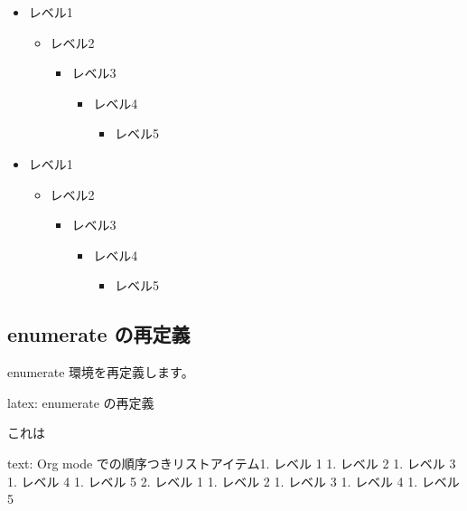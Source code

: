 \documentclass[dvipdfmx,a4j,14pt,uplatex,openany]{jsbook}
\begin{document}
\begin{itemize}
\item レベル1
\begin{itemize}
\item レベル2
\begin{itemize}
\item レベル3
\begin{itemize}
\item レベル4
\begin{itemize}
\item レベル5
\end{itemize}
\end{itemize}
\end{itemize}
\end{itemize}
\item レベル1
\begin{itemize}
\item レベル2
\begin{itemize}
\item レベル3
\begin{itemize}
\item レベル4
\begin{itemize}
\item レベル5
\end{itemize}
\end{itemize}
\end{itemize}
\end{itemize}
\end{itemize}

\subsection{enumerate の再定義}
\label{sec:orgddf24a6}
enumerate 環境を再定義します。

\begin{programlist}[label={org5f332ba}]{latex}{: enumerate の再定義}
\end{programlist}

これは

\begin{programlist}[label={org5c60f0e}]{text}{: Org mode での順序つきリストアイテム}1. レベル 1
   1. レベル 2
      1. レベル 3
         1. レベル 4
            1. レベル 5
2. レベル 1
   1. レベル 2
      1. レベル 3
         1. レベル 4
            1. レベル 5
\end{programlist}
\end{document}
